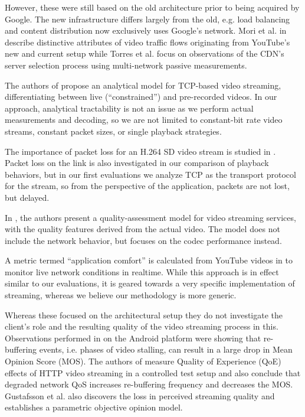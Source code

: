 However, these were still based on the old architecture prior to being acquired by Google. The new infrastructure differs largely from the old, e.g. load balancing and content distribution now exclusively uses Google’s network. Mori et al. in \cite{mori2010characterizing} describe distinctive attributes of video traffic flows originating from YouTube's new and current setup while Torres et al. \cite{torres2011dissecting} focus on observations of the CDN's server selection process using multi-network passive measurements.


The authors of \cite{wang2003model} propose an analytical model for TCP-based video streaming, differentiating between live (``constrained'') and pre-recorded videos. In our approach, analytical tractability is not an issue as we perform actual measurements and decoding, so we are not limited to constant-bit rate video streams, constant packet sizes, or single playback strategies.

The importance of packet loss for an H.264 SD video stream is studied in \cite{pv2010loss}. Packet loss on the link is also investigated in our comparison of playback behaviors, but in our first evaluations we analyze TCP as the transport protocol for the stream, so from the perspective of the application, packets are not lost, but delayed.


In \cite{pv2010qoe}, the authors present a quality-assessment model for video streaming services, with the quality features derived from the actual video. The model does not include the network behavior, but focuses on the codec performance instead. 

A metric termed ``application comfort'' is calculated from YouTube videos in \cite{staehle2010yomo} to monitor live network conditions in realtime. While this approach is in effect similar to our evaluations, it is geared towards a very specific implementation of streaming, whereas we believe our methodology is more generic.

Whereas these focused on the architectural setup they do not investigate the client's role and the resulting quality of the video streaming process in this. 
Observations performed in \cite{ketyko2010qoe} on the Android platform were showing that re-buffering events, i.e. phases of video stalling, can result in a large drop in Mean Opinion Score (MOS). The authors of \cite{mokmeasuring} measure Quality of Experience (QoE) effects of HTTP video streaming in a controlled test setup and also conclude that degraded network QoS increases re-buffering frequency and decreases the MOS. Gustafsson et al. \cite{gustafsson2008measuring} also discovers the loss in perceived streaming quality and establishes a parametric objective opinion model.
